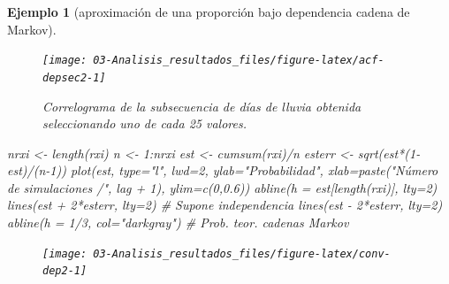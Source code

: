\documentclass[
]{book}
\newenvironment{Shaded}{\begin{snugshade}}{\end{snugshade}}
\newcommand{\AttributeTok}[1]{\textcolor[rgb]{0.77,0.63,0.00}{#1}}
\newcommand{\CommentTok}[1]{\textcolor[rgb]{0.56,0.35,0.01}{\textit{#1}}}
\newcommand{\DecValTok}[1]{\textcolor[rgb]{0.00,0.00,0.81}{#1}}
\newcommand{\FloatTok}[1]{\textcolor[rgb]{0.00,0.00,0.81}{#1}}
\newcommand{\FunctionTok}[1]{\textcolor[rgb]{0.00,0.00,0.00}{#1}}
\newcommand{\NormalTok}[1]{#1}
\newcommand{\OtherTok}[1]{\textcolor[rgb]{0.56,0.35,0.01}{#1}}
\newcommand{\SpecialCharTok}[1]{\textcolor[rgb]{0.00,0.00,0.00}{#1}}
\newcommand{\StringTok}[1]{\textcolor[rgb]{0.31,0.60,0.02}{#1}}
\theoremstyle{break}
\newtheorem{example}{Ejemplo}[chapter]
\theoremstyle{nonumberplain}
\begin{document}
\begin{example}[aproximación de una proporción bajo dependencia cadena de Markov]
\begin{figure}[!htb]
{\centering \texttt{[image: 03-Analisis\_resultados\_files/figure-latex/acf-depsec2-1]} 

}

\caption{Correlograma de la subsecuencia de días de lluvia obtenida seleccionando uno de cada 25 valores.}\label{fig:acf-depsec2}
\end{figure}

\begin{Shaded}
\begin{Highlighting}[]
\NormalTok{nrxi }\OtherTok{\textless{}{-}} \FunctionTok{length}\NormalTok{(rxi)}
\NormalTok{n }\OtherTok{\textless{}{-}} \DecValTok{1}\SpecialCharTok{:}\NormalTok{nrxi}
\NormalTok{est }\OtherTok{\textless{}{-}} \FunctionTok{cumsum}\NormalTok{(rxi)}\SpecialCharTok{/}\NormalTok{n}
\NormalTok{esterr }\OtherTok{\textless{}{-}} \FunctionTok{sqrt}\NormalTok{(est}\SpecialCharTok{*}\NormalTok{(}\DecValTok{1}\SpecialCharTok{{-}}\NormalTok{est)}\SpecialCharTok{/}\NormalTok{(n}\DecValTok{{-}1}\NormalTok{))}
\FunctionTok{plot}\NormalTok{(est, }\AttributeTok{type=}\StringTok{"l"}\NormalTok{, }\AttributeTok{lwd=}\DecValTok{2}\NormalTok{, }\AttributeTok{ylab=}\StringTok{"Probabilidad"}\NormalTok{, }
     \AttributeTok{xlab=}\FunctionTok{paste}\NormalTok{(}\StringTok{"Número de simulaciones /"}\NormalTok{, lag }\SpecialCharTok{+} \DecValTok{1}\NormalTok{), }\AttributeTok{ylim=}\FunctionTok{c}\NormalTok{(}\DecValTok{0}\NormalTok{,}\FloatTok{0.6}\NormalTok{))}
\FunctionTok{abline}\NormalTok{(}\AttributeTok{h =}\NormalTok{ est[}\FunctionTok{length}\NormalTok{(rxi)], }\AttributeTok{lty=}\DecValTok{2}\NormalTok{)}
\FunctionTok{lines}\NormalTok{(est }\SpecialCharTok{+} \DecValTok{2}\SpecialCharTok{*}\NormalTok{esterr, }\AttributeTok{lty=}\DecValTok{2}\NormalTok{) }\CommentTok{\# Supone independencia}
\FunctionTok{lines}\NormalTok{(est }\SpecialCharTok{{-}} \DecValTok{2}\SpecialCharTok{*}\NormalTok{esterr, }\AttributeTok{lty=}\DecValTok{2}\NormalTok{)}
\FunctionTok{abline}\NormalTok{(}\AttributeTok{h =} \DecValTok{1}\SpecialCharTok{/}\DecValTok{3}\NormalTok{, }\AttributeTok{col=}\StringTok{"darkgray"}\NormalTok{)     }\CommentTok{\# Prob. teor. cadenas Markov}
\end{Highlighting}
\end{Shaded}

\begin{figure}[!htb]

{\centering \texttt{[image: 03-Analisis\_resultados\_files/figure-latex/conv-dep2-1]} 

}


\end{figure}
\end{example}
\end{document}
